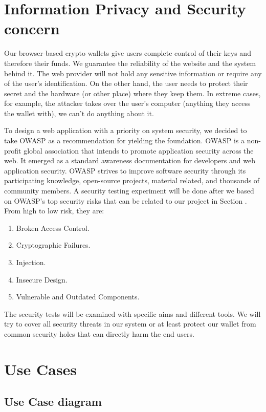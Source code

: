 \section{Information Privacy and Security concern}

Our browser-based crypto wallets give users complete control of their keys and therefore their funds. We guarantee the reliability of the website and the system behind it. The web provider will not hold any sensitive information or require any of the user's identification. On the other hand, the user needs to protect their secret and the hardware (or other place) where they keep them. In extreme cases, for example, the attacker takes over the user's computer (anything they access the wallet with), we can't do anything about it.

To design a web application with a priority on system security, we decided to take OWASP as a recommendation for yielding the foundation. OWASP is a non-profit global association that intends to promote application security across the web. It emerged as a standard awareness documentation for developers and web application security. OWASP strives to improve software security through its participating knowledge, open-source projects, material related, and thousands of community members. A security testing experiment will be done after we based on OWASP's top security risks that can be related to our project in Section . From high to low risk, they are:

\begin{enumerate}
    \item Broken Access Control.
    \item Cryptographic Failures.
    \item Injection.
    \item Insecure Design.
    \item Vulnerable and Outdated Components.
\end{enumerate}

The security tests will be examined with specific aims and different tools. We will try to cover all security threats in our system or at least protect our wallet from common security holes that can directly harm the end users.


\section{Use Cases}

\subsection{Use Case diagram}

